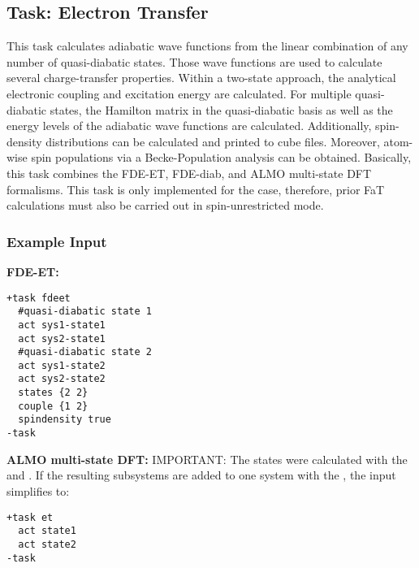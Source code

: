 \subsection{Task: Electron Transfer}

This task calculates adiabatic wave functions from the linear combination of any number of quasi-diabatic states.
Those wave functions are used to calculate several charge-transfer properties. Within a two-state approach, the
analytical electronic coupling and  excitation energy are calculated. For multiple quasi-diabatic states, the Hamilton
matrix in the quasi-diabatic basis as well as the energy levels of the adiabatic wave functions are calculated.
Additionally, spin-density distributions can be calculated and printed to cube files. Moreover, atom-wise spin
populations via a Becke-Population analysis can be obtained. Basically, this task combines the FDE-ET, FDE-diab,
and ALMO multi-state DFT formalisms. This task is only implemented for the  case, therefore,
prior FaT calculations must also be carried out in spin-unrestricted mode.
\subsubsection{Example Input}
\textbf{FDE-ET:}
\begin{lstlisting}
+task fdeet
  #quasi-diabatic state 1
  act sys1-state1
  act sys2-state1
  #quasi-diabatic state 2
  act sys1-state2
  act sys2-state2
  states {2 2}
  couple {1 2}
  spindensity true
-task
\end{lstlisting}
\textbf{ALMO multi-state DFT:}
{\color{red}IMPORTANT:} The states were calculated with the  and . If the 
resulting subsystems are added to one system with the , the input simplifies to:
\begin{lstlisting}
+task et
  act state1
  act state2
-task
\end{lstlisting}

